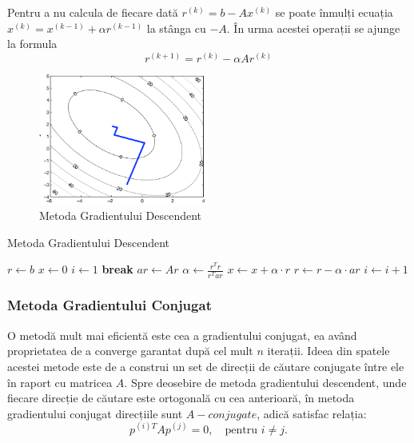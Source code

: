\documentclass{exam}
\begin{document}
Pentru a nu calcula de fiecare dată $r^{(k)} = b - Ax^{(k)}$ se poate înmulți ecuația $x^{(k)} = x^{(k-1)} + \alpha r^{(k-1)}$ la stânga cu $-A$. În urma acestei operații se ajunge la formula $$r^{(k+1)} = r^{(k)} - \alpha Ar^{(k)}$$

\begin{figure}[ht]
	\centering
	\includegraphics[width=0.5\textwidth]{steepest_descent.png}
	\caption{Metoda Gradientului Descendent}
	\label{fig:1}
\end{figure}

\begin{algorithm}
	\caption{Metoda Gradientului Descendent}
	\begin{algorithmic}[1]
		\State $r \gets b$
		\State $x \gets 0$
		\State $i \gets 1$
		\State \textbf{break}
		\EndIf
		\State $ar \gets A r$
		\State $\alpha \gets \frac{r^T r}{r^T ar}$
		\State $x \gets x + \alpha \cdot r$
		\State $r \gets r - \alpha \cdot ar$
		\State $i \gets i + 1$
		\EndWhile
	\end{algorithmic}
\end{algorithm}

\subsubsection{Metoda Gradientului Conjugat}

O metodă mult mai eficientă este cea a gradientului conjugat, ea având
proprietatea de a converge garantat după cel mult $n$ iterații. Ideea din
spatele acestei metode este de a construi un set de direcții de căutare
conjugate între ele în raport cu matricea $A$. Spre deosebire de metoda
gradientului descendent, unde fiecare direcție de căutare este ortogonală cu cea
anterioară, în metoda gradientului conjugat direcțiile sunt $A-conjugate$, adică
satisfac relația:
\begin{equation*}
	p^{(i)T} A p^{(j)} = 0, \quad \text{pentru } i \neq j.
\end{equation*}
\end{document}

